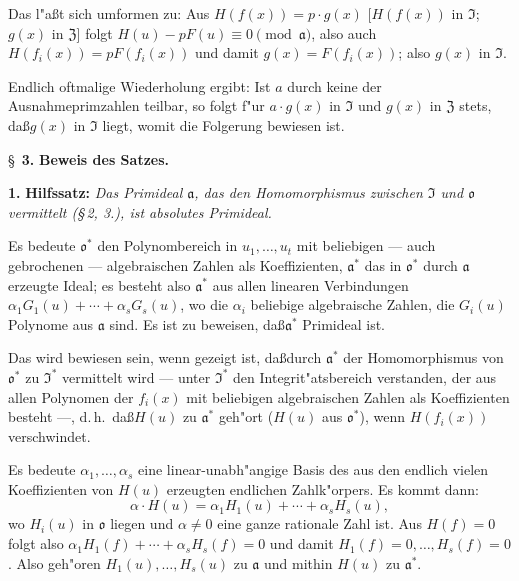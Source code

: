 \documentclass[12pt,a4paper]{article}
\theoremstyle{plain}
\begin{document}
Das l"a\ss t sich umformen zu: Aus $H(f(x)) = p \cdot g(x)$ [$H(f(x))$ in $\mathfrak{I}$; $g(x)$ in $\mathfrak{Z}$] folgt $H(u) - pF(u) \equiv 0 \pmod{\mathfrak{a}}$, also auch $H(f_i(x)) = pF(f_i(x))$ und damit $g(x) = F(f_i(x))$; also $g(x)$ in $\mathfrak{I}$.

Endlich oftmalige Wiederholung ergibt: Ist $a$ durch keine der Ausnahmeprimzahlen teilbar, so folgt f"ur $a \cdot g(x)$ in $\mathfrak{I}$ und $g(x)$ in $\mathfrak{Z}$ stets, da\ss $g(x)$ in $\mathfrak{I}$ liegt, womit die Folgerung bewiesen ist.

\newpage
\S~\textbf{3.}
\textbf{Beweis des Satzes.}

\smallskip

\noindent\textbf{1.} \textbf{Hilfssatz:}
\textit{Das Primideal $\mathfrak{a}$, das den Homomorphismus zwischen $\mathfrak{I}$ und $\mathfrak{o}$ vermittelt (\S\,2, 3.), ist absolutes Primideal.}

Es bedeute $\mathfrak{o}^*$ den Polynombereich in $u_1,\ldots,u_t$ mit beliebigen --- auch gebrochenen --- algebraischen Zahlen als Koeffizienten, $\mathfrak{a}^*$ das in $\mathfrak{o}^*$ durch $\mathfrak{a}$ erzeugte Ideal; es besteht also $\mathfrak{a}^*$ aus allen linearen Verbindungen $\alpha_1 G_1(u) + \cdots + \alpha_s G_s(u)$, wo die $\alpha_i$ beliebige algebraische Zahlen, die $G_i(u)$ Polynome aus $\mathfrak{a}$ sind. Es ist zu beweisen, da\ss $\mathfrak{a}^*$ Primideal ist.

Das wird bewiesen sein, wenn gezeigt ist, da\ss durch $\mathfrak{a}^*$ der Homomorphismus von $\mathfrak{o}^*$ zu $\mathfrak{I}^*$ vermittelt wird --- unter $\mathfrak{I}^*$ den Integrit"atsbereich verstanden, der aus allen Polynomen der $f_i(x)$ mit beliebigen algebraischen Zahlen als Koeffizienten besteht ---, d.\,h.\ da\ss $H(u)$ zu $\mathfrak{a}^*$ geh"ort ($H(u)$ aus $\mathfrak{o}^*$), wenn $H(f_i(x))$ verschwindet.

Es bedeute $\alpha_1,\ldots,\alpha_s$ eine linear-unabh"angige Basis des aus den endlich vielen Koeffizienten von $H(u)$ erzeugten endlichen Zahlk"orpers. Es kommt dann:
\[
\alpha \cdot H(u) = \alpha_1 H_1(u) + \cdots + \alpha_s H_s(u),
\]
wo $H_i(u)$ in $\mathfrak{o}$ liegen und $\alpha \neq 0$ eine ganze rationale Zahl ist. Aus $H(f) = 0$ folgt also $\alpha_1 H_1(f) + \cdots + \alpha_s H_s(f) = 0$ und damit $H_1(f) = 0,\ldots, H_s(f) = 0$. Also geh"oren $H_1(u),\ldots,H_s(u)$ zu $\mathfrak{a}$ und mithin $H(u)$ zu $\mathfrak{a}^*$.
\end{document}
